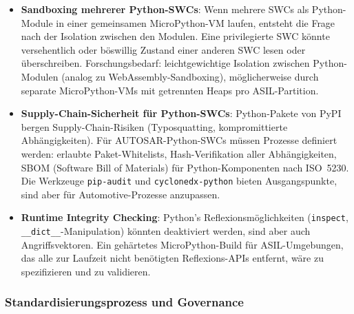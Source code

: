 ﻿\documentclass[12pt,a4paper,twoside]{article}
\begin{document}
\begin{itemize}
  \item \textbf{Sandboxing mehrerer Python-SWCs}:
        Wenn mehrere SWCs als Python-Module in einer gemeinsamen MicroPython-VM
        laufen, entsteht die Frage nach der Isolation zwischen den Modulen.
        Eine privilegierte SWC könnte versehentlich oder böswillig Zustand
        einer anderen SWC lesen oder überschreiben.
        Forschungsbedarf: leichtgewichtige Isolation zwischen Python-Modulen
        (analog zu WebAssembly-Sandboxing), möglicherweise durch
        separate MicroPython-VMs mit getrennten Heaps pro ASIL-Partition.

  \item \textbf{Supply-Chain-Sicherheit für Python-SWCs}:
        Python-Pakete von PyPI~\cite{pypi_stats2024} bergen Supply-Chain-Risiken
        (Typosquatting, kompromittierte Abhängigkeiten).
        Für AUTOSAR-Python-SWCs müssen Prozesse definiert werden:
        erlaubte Paket-Whitelists, Hash-Verifikation aller Abhängigkeiten,
        SBOM (Software Bill of Materials) für Python-Komponenten nach ISO~5230.
        Die Werkzeuge \texttt{pip-audit} und \texttt{cyclonedx-python} bieten
        Ausgangspunkte, sind aber für Automotive-Prozesse anzupassen.

  \item \textbf{Runtime Integrity Checking}:
        Python's Reflexionsmöglichkeiten (\texttt{inspect}, \newline \texttt{\_\_dict\_\_}-Manipulation)
        könnten deaktiviert werden, sind aber auch Angriffsvektoren.
        Ein gehärtetes MicroPython-Build für ASIL-Umgebungen, das alle
        zur Laufzeit nicht benötigten Reflexions-APIs entfernt, wäre
        zu spezifizieren und zu validieren.
\end{itemize}

\subsubsection{Standardisierungsprozess und Governance}
\end{document}
